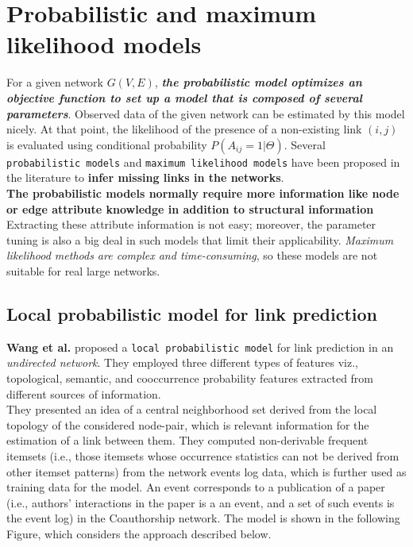 \section{Probabilistic and maximum likelihood models}

For a given network \(G(V, E)\), \textbf{\emph{the probabilistic model
        optimizes an objective function to set up a model that is composed of
        several parameters}}. Observed data of the given network can be
estimated by this model nicely. At that point, the likelihood of the
presence of a non-existing link \((i, j)\) is evaluated using
conditional probability \(P(A_{i j} = 1 | \Theta )\). Several
\texttt{probabilistic\ models} and \texttt{maximum\ likelihood\ models}
have been proposed in the literature to \textbf{infer missing links in
    the networks}.\\

\textbf{The probabilistic models normally require more information like
    node or edge attribute knowledge in addition to structural information}
Extracting these attribute information is not easy; moreover, the
parameter tuning is also a big deal in such models that limit their
applicability. \emph{Maximum likelihood methods are complex and
    time-consuming}, so these models are not suitable for real large
networks.

\subsection{Local probabilistic model for link prediction}

\textbf{Wang et al.} proposed a \texttt{local\ probabilistic\ model} for
link prediction in an \emph{undirected network}. They employed three
different types of features viz., topological, semantic, and
cooccurrence probability features extracted from different sources of
information.\\

They presented an idea of a central neighborhood set derived from the
local topology of the considered node-pair, which is relevant
information for the estimation of a link between them. They computed
non-derivable frequent itemsets (i.e., those itemsets whose occurrence
statistics can not be derived from other itemset patterns) from the
network events log data, which is further used as training data for the
model. An event corresponds to a publication of a paper (i.e., authors'
interactions in the paper is a an event, and a set of such events is the
event log) in the Coauthorship network. The model is shown in the
following Figure, which considers the approach described below.\\

